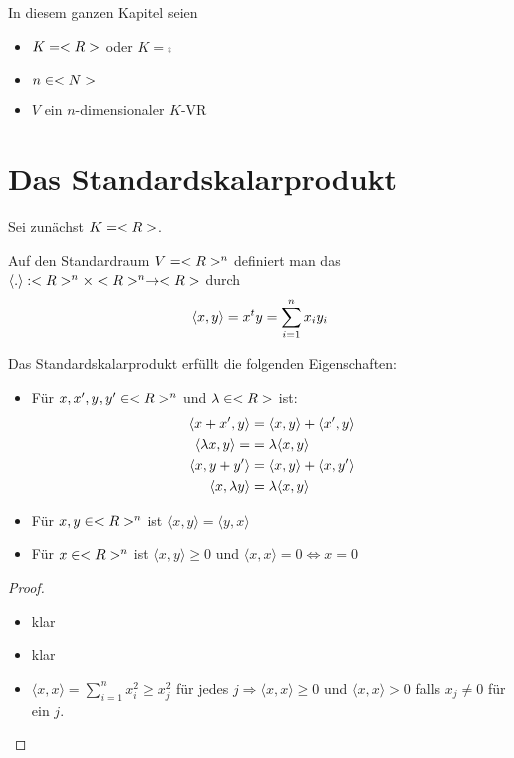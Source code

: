 In diesem ganzen Kapitel seien
\begin{itemize}
	\item $K=<R>$ oder $K=\comp$
	\item $n\in<N>$
	\item $V$ ein $n$-dimensionaler $K$-VR
\end{itemize}

\section{Das Standardskalarprodukt}

Sei zunächst $K=<R>$.

\begin{definition}
	Auf den Standardraum $V=<R>^n$ definiert man das  $\langle.\rangle:<R>^n\times<R>^n\to <R>$ durch
	\begin{align}
		\left\langle x,y\right\rangle=x^ty=\sum_{i=1}^n x_iy_i\notag
	\end{align}
\end{definition}

\begin{proposition}
	Das Standardskalarprodukt erfüllt die folgenden Eigenschaften:
	\begin{itemize}
		\item Für $x,x',y,y'\in<R>^n$ und $\lambda\in<R>$ ist:
		\begin{align}
			\langle x+x',y\rangle &= \langle x,y\rangle + \langle x',y\rangle\notag\\
			\langle \lambda x,y\rangle =&= \lambda \langle x,y \rangle\notag \\
			\langle x,y+y' \rangle &= \langle x,y \rangle + \langle x,y'\rangle\notag \\
			\langle x,\lambda y \rangle &= \lambda \langle x,y \rangle\notag
		\end{align}
		\item Für $x,y\in<R>^n$ ist $\langle x,y \rangle=\langle y,x\rangle$
		\item Für $x\in<R>^n$ ist $\langle x,y \rangle\ge 0$ und $\langle x,x\rangle=0\iff x=0$
	\end{itemize}
\end{proposition}
\begin{proof}
	\begin{itemize}
		\item klar
		\item klar
		\item $\langle x,x\rangle=\sum_{i=1}^n x_i^2\ge x_j^2$ für jedes $j\Rightarrow \langle x,x\rangle\ge 0$ und $\langle x,x \rangle>0$ falls $x_j\neq 0$ für ein $j$.
	\end{itemize}
\end{proof}

